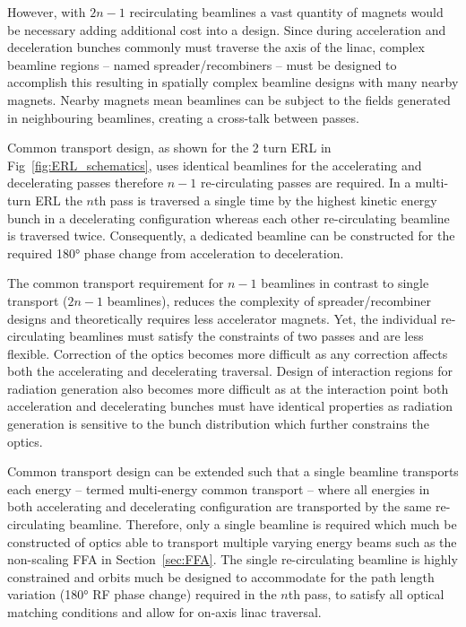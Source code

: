 \documentclass[../main.tex]{subfiles}
\begin{document}
However, with $2n-1$ recirculating beamlines a vast quantity of magnets would be necessary adding additional cost into a design. Since during acceleration and deceleration bunches commonly must traverse the axis of the linac, complex beamline regions -- named spreader/recombiners -- must be designed to accomplish this resulting in spatially complex beamline designs with many nearby magnets. Nearby magnets mean beamlines can be subject to the fields generated in neighbouring beamlines, creating a cross-talk between passes.

Common transport design, as shown for the 2 turn ERL in Fig~\ref{fig:ERL_schematics}, uses identical beamlines for the accelerating and decelerating passes therefore $n-1$ re-circulating passes are required. In a multi-turn ERL the $n$th pass is traversed a single time by the highest kinetic energy bunch in a decelerating configuration whereas each other re-circulating beamline is traversed twice. Consequently, a dedicated beamline can be constructed for the required 180\si{\degree} phase change from acceleration to deceleration.

The common transport requirement for $n-1$ beamlines in contrast to single transport ($2n-1$ beamlines), reduces the complexity of spreader/recombiner designs and theoretically requires less accelerator magnets. Yet, the individual re-circulating beamlines must satisfy the constraints of two passes and are less flexible. Correction of the optics becomes more difficult as any correction affects both the accelerating and decelerating traversal. Design of interaction regions for radiation generation also becomes more difficult as at the interaction point both acceleration and decelerating bunches must have identical properties as radiation generation is sensitive to the bunch distribution which further constrains the optics.

Common transport design can be extended such that a single beamline transports each energy -- termed multi-energy common transport -- where all energies in both accelerating and decelerating configuration are transported by the same re-circulating beamline. Therefore, only a single beamline is required which much be constructed of optics able to transport multiple varying energy beams such as the non-scaling FFA in Section~\ref{sec:FFA}. The single re-circulating beamline is highly constrained and orbits much be designed to accommodate for the path length variation (180\si{\degree} RF phase change) required in the $n$th pass, to satisfy all optical matching conditions and allow for on-axis linac traversal. 
\end{document}
